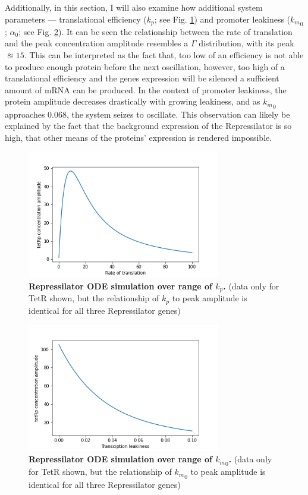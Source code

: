 \documentclass[runningheads,a4paper]{llncs}
\begin{document}
Additionally, in this section, I will also examine how additional system parameters --- translational efficiency ($k_{p}$; see Fig. \ref{fig:fig10}) and promoter leakiness (${k_{m}}_{0}$; $\alpha_{0}$; see Fig. \ref{fig:fig11}). It can be seen the relationship between the rate of translation and the peak concentration amplitude resembles a $\Gamma$ distribution, with its peak $\approxeq 15$. This can be interpreted as the fact that, too low of an efficiency is not able to produce enough protein before the next oscillation, however, too high of a translational efficiency and the genes expression will be silenced a sufficient amount of mRNA can be produced. In the context of promoter leakiness, the protein amplitude decreases drastically with growing leakiness, and as ${k_{m}}_{0}$ approaches $0.068$, the system seizes to oscillate. This observation can likely be explained by the fact that the background expression of the Repressilator is so high, that other means of the proteins' expression is rendered impossible.

\begin{figure}
    \singlespacing
    \centering
    \includegraphics[width=0.75\textwidth]{suplementary_information_and_code/Task3_figure4.png}
    \caption{\textbf{Repressilator ODE simulation over range of $k_{p}$.} (data only for TetR shown, but the relationship of $k_{p}$ to peak amplitude is identical for all three Repressilator genes)}
    \label{fig:fig10}
\end{figure}

\begin{figure}
    \singlespacing
    \centering
    \includegraphics[width=0.75\textwidth]{suplementary_information_and_code/Task3_figure5.png}
    \caption{\textbf{Repressilator ODE simulation over range of ${k_{m}}_{0}$.} (data only for TetR shown, but the relationship of ${k_{m}}_{0}$ to peak amplitude is identical for all three Repressilator genes)}
    \label{fig:fig11}
\end{figure}
\end{document}
